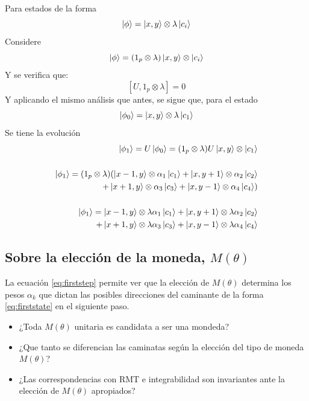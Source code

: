 \documentclass[12pt,a4paper]{article}
\begin{document}
Para estados de la forma 
\begin{equation}
    \ket{\phi}=\ket{x,y}\otimes \lambda \ket{c_i}
\end{equation}
Considere 
\begin{equation*}
    \ket{\phi}=(1_p\otimes \lambda)\ket{x,y}\otimes \ket{c_i}
\end{equation*}
Y se verifica que: \[[U,1_p\otimes \lambda]=0\]
Y aplicando el mismo análisis que antes, se sigue que, para el estado
\[\ket{\phi_0}=\ket{x,y}\otimes \lambda \ket{c_1}\]
Se tiene la evolución
\begin{align*}
   \ket{\phi_1}= U\ket{\phi_0}=(1_p\otimes \lambda )U\ket{x,y}\otimes \ket{c_1}
   \\
   \\
  \ket{\phi_1} =(1_p\otimes \lambda )(\ket{x-1,y}\otimes \alpha_1 \ket{c_1}+\ket{x,y+1}\otimes \alpha_2 \ket{c_2}
   \\
   +\ket{x+1,y}\otimes \alpha_3 \ket{c_3}+\ket{x,y-1}\otimes \alpha_4 \ket{c_4})
   \\\\
    \ket{\phi_1} =\ket{x-1,y}\otimes \lambda\alpha_1 \ket{c_1}+\ket{x,y+1}\otimes \lambda\alpha_2 \ket{c_2}
   \\
   +\ket{x+1,y}\otimes \lambda\alpha_3 \ket{c_3}+\ket{x,y-1}\otimes \lambda\alpha_4 \ket{c_4}
\end{align*}

\subsection{Sobre la elección de la moneda, $M(\theta)$}
La ecuación \eqref{eq:firststep} permite ver que la elección de $M(\theta)$ determina los pesos $\alpha_k$ que
dictan las posibles direcciones del caminante de la forma \eqref{eq:firststate} en el siguiente paso.

\begin{itemize}

    \item ¿Toda $M(\theta)$ unitaria es candidata a ser una mondeda?
    \item ¿Que tanto se diferencian las caminatas según la elección del tipo de moneda $M(\theta)$?
    \item ¿Las correspondencias con RMT e integrabilidad son invariantes ante la elección de $M(\theta)$ apropiados?

\end{itemize}
\end{document}
